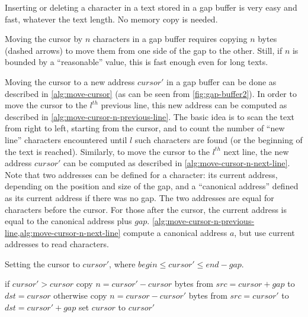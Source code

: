 \begin{Figure}
  

  \caption{Inserting or deleting a character in a text stored in a gap buffer
  is very easy and fast, whatever the text length. No memory copy is
  needed.}\label{fig:gap-buffer}
\end{Figure}

\begin{Figure}
  

  \caption{Moving the cursor by $n$ characters in a gap buffer requires copying
  $n$ bytes (dashed arrows) to move them from one side of the gap to the other.
  Still, if $n$ is bounded by a ``reasonable'' value, this is fast enough even
  for long texts.}\label{fig:gap-buffer2}
\end{Figure}

Moving the cursor to a new address $cursor'$ in a gap buffer can be done as
described in \cref{alg:move-cursor} (as can be seen from
\cref{fig:gap-buffer2}). In order to move the cursor to the $l^{th}$ previous
line, this new address can be computed as described in
\cref{alg:move-cursor-n-previous-line}. The basic idea is to scan the text from
right to left, starting from the cursor, and to count the number of ``new
line'' characters encountered until $l$ such characters are found (or the
beginning of the text is reached). Similarly, to move the cursor to the
$l^{th}$ next line, the new address $cursor'$ can be computed as described in
\cref{alg:move-cursor-n-next-line}. Note that two addresses can be defined for
a character: its current address, depending on the position and size of the
gap, and a ``canonical address'' defined as its current address if there was no
gap. The two addresses are equal for characters before the cursor. For those
after the cursor, the current address is equal to the canonical address plus
$gap$. \cref{alg:move-cursor-n-previous-line,alg:move-cursor-n-next-line}
compute a canonical address $a$, but use current addresses to read characters.

\begin{Algorithm}
\caption{Setting the cursor to $cursor'$, where $begin \le cursor' \le end -
gap$.}\label{alg:move-cursor}
\begin{algorithmic}
\Begin if $cursor' > cursor$
\State copy $n=cursor'-cursor$ bytes from $src=cursor+gap$ to $dst=cursor$
\Continue otherwise
\State copy $n=cursor-cursor'$ bytes from $src=cursor'$ to $dst=cursor'+gap$
\End
\State set $cursor$ to $cursor'$
\end{algorithmic}
\end{Algorithm}


